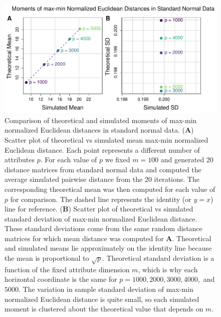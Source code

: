 \documentclass[10pt,letterpaper]{article}\usepackage[]{graphicx}\usepackage[]{color}
\begin{document}
\begin{figure}[H]
	\includegraphics[width=\textwidth]{compared_moments_normal_euclidean_max-min.pdf}
	\caption{Comparison of theoretical and simulated moments of max-min normalized Euclidean distances in standard normal data. (\textbf{A}) Scatter plot of theoretical vs simulated mean max-min normalized Euclidean distance. Each point represents a different number of attributes $p$. For each value of $p$ we fixed $m=100$ and generated 20 distance matrices from standard normal data and computed the average simulated pairwise distance from the 20 iterations. The corresponding theoretical mean was then computed for each value of $p$ for comparison. The dashed line represents the identity (or $y=x$) line for reference. (\textbf{B}) Scatter plot of theoretical vs simulated standard deviation of max-min normalized Euclidean distance. These standard deviations come from the same random distance matrices for which mean distance was computed for \textbf{A}. Theoretical and simulated means lie approximately on the identity line because the mean is proportional to $\sqrt{p}$. Theoretical standard deviation is a function of the fixed attribute dimension $m$, which is why each horizontal coordinate is the same for $p=1000,2000,3000,4000,$ and $5000$. The variation in sample standard deviation of max-min normalized Euclidean distance is quite small, so each simulated moment is clustered about the theoretical value that depends on $m$.}
\end{figure}
\end{document}

